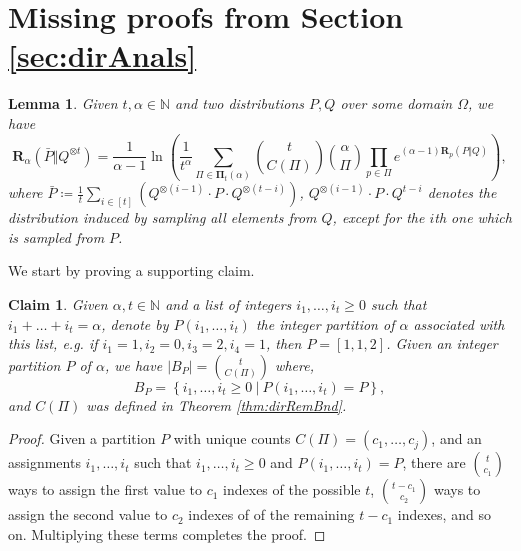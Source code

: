 \documentclass{article}
\theoremstyle{plain}
\newtheorem{lemma}[theorem]{Lemma}
\newtheorem{claim}[theorem]{Claim}
\theoremstyle{definition}
\newcommand{\naturals}{\mathbb{N}}
\newcommand{\Renyi}[1]{\boldsymbol{R}_{#1}}
\newcommand{\RenyiDiv}[3]{\Renyi{#1}\left(#2 \Vert #3 \right)}
\begin{document}
\section{Missing proofs from Section \ref{sec:dirAnals}} \label{apd:dirAnals}
\begin{lemma}\label{lem:dirRemBnd}
    Given $t, \alpha \in \naturals$ and two distributions $P, Q$ over some domain $\Omega$, we have
    \[
        \RenyiDiv{\alpha}{\bar{P}}{Q^{\otimes t}} = \frac{1}{\alpha-1} \ln\left(\frac{1}{t^{\alpha}} \sum_{\Pi \in \boldsymbol{\Pi}_{t}(\alpha)} \binom{t}{C(\Pi)} \binom{\alpha}{\Pi} \prod_{p \in \Pi} e^{(\alpha-1) \RenyiDiv{p}{P}{Q}} \right),
    \]
    where $\bar{P} \coloneqq \frac{1}{t} \sum_{i \in [t]} \left(Q^{\otimes (i-1)} \cdot P \cdot Q^{\otimes (t-i)} \right)$, $Q^{\otimes (i-1)} \cdot P \cdot Q^{t-i}$ denotes the distribution induced by sampling all elements from $Q$, except for the $i$th one which is sampled from $P$.
\end{lemma}
We start by proving a supporting claim.
\begin{claim} \label{clm:multiCount}
    Given $\alpha, t \in \naturals$  and a list of integers $i_{1}, \ldots, i_{t} \ge 0$ such that $i_{1} + \ldots + i_{t} = \alpha$, denote by $P(i_{1}, \ldots, i_{t})$ the integer partition of $\alpha$ associated with this list, e.g. if $i_{1} = 1, i_{2} = 0, i_{3} = 2, i_{4} = 1$, then $P = [1, 1, 2]$. Given an integer partition $P$ of $\alpha$, we have $\vert B_{P} \vert = \binom{t}{C(\Pi)}$ where, 
    \[
        B_{P} = \left\{i_{1}, \ldots, i_{t} \ge 0 ~\vert~ P(i_{1}, \ldots, i_{t}) = P \right\},
    \]
    and $C(\Pi)$ was defined in Theorem \ref{thm:dirRemBnd}.
\end{claim}

\begin{proof}
    Given a partition $P$ with unique counts $C(\Pi) = (c_{1}, \ldots, c_{j})$, and an assignments $i_{1}, \ldots, i_{t}$ such that $i_{1}, \ldots, i_{t} \ge 0$ and $P(i_{1}, \ldots, i_{t}) = P$, there are $\binom{t}{c_{1}}$ ways to assign the first value to $c_{1}$ indexes of the possible $t$, $\binom{t - c_{1}}{c_{2}}$ ways to assign the second value to $c_{2}$ indexes of of the remaining $t - c_{1}$ indexes, and so on. Multiplying these terms completes the proof.
\end{proof}
\end{document}
